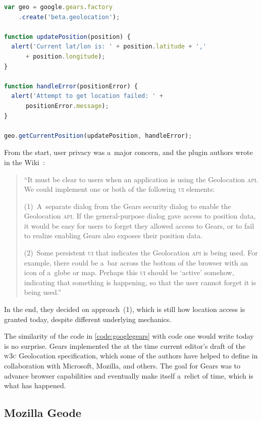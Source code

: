 \documentclass[sigconf,hyphens]{acmart}
\begin{document}
\begin{lstlisting}[caption={Google Gears \textsc{api} (2008)},
  label=code:googlegears, language=JavaScript, float=h] 
var geo = google.gears.factory
    .create('beta.geolocation');

function updatePosition(position) {
  alert('Current lat/lon is: ' + position.latitude + ','
      + position.longitude);
}

function handleError(positionError) {
  alert('Attempt to get location failed: ' +
      positionError.message);
}

geo.getCurrentPosition(updatePosition, handleError);
\end{lstlisting} 

From the start, user privacy was a~major concern, and
the plugin authors wrote in the Wiki~\cite{gears2008wiki}:

\begin{quote}
``It must be clear to users when an application is using the Geolocation \textsc{api}.
We could implement one or both of the following \textsc{ui} elements:

(1)~A~separate dialog from the Gears security dialog to enable the Geolocation \textsc{api}.
If the general-purpose dialog gave access to position data,
it would be easy for users to forget they allowed access to Gears,
or to fail to realize enabling Gears also exposes their position data.

(2)~Some persistent \textsc{ui} that indicates the Geolocation \textsc{api} is being used.
For example, there could be a~bar across the bottom of the browser with an icon of a~globe or map.
Perhaps this \textsc{ui} should be `active' somehow, indicating that something is happening,
so that the user cannot forget it is being used.''
\end{quote}

In the end, they decided on approach~(1), which is still how location access is granted today,
despite different underlying mechanics.

The similarity of the code in \autoref{code:googlegears} with code one would write today is no surprise.
Gears implemented the at the time current editor's draft of the \textsc{w3c} Geolocation
specification, which some of the authors have helped to define in collaboration with Microsoft,
Mozilla, and others. The goal for Gears was to advance browser capabilities and eventually make
itself a~relict of time, which is what has happened.

\subsection{Mozilla Geode}
\end{document}
